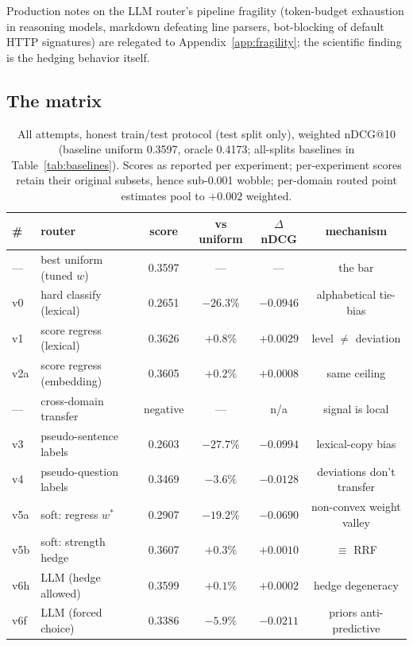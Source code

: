 \documentclass[11pt]{article}
\begin{document}
Production notes on the LLM router's pipeline fragility (token-budget exhaustion in reasoning models, markdown defeating line parsers, bot-blocking of default HTTP signatures) are relegated to Appendix~\ref{app:fragility}; the scientific finding is the hedging behavior itself.

\subsection{The matrix}\label{sec:matrix}
\begin{table}[H]
\centering\footnotesize
\begin{tabular}{llcccc}
\toprule
\# & router & score & vs uniform & $\Delta$nDCG & mechanism \\
\midrule
--- & best uniform (tuned $w$) & 0.3597 & --- & --- & the bar \\
v0 & hard classify (lexical) & 0.2651 & $-26.3\%$ & $-0.0946$ & alphabetical tie-bias \\
v1 & score regress (lexical) & 0.3626 & $+0.8\%$ & $+0.0029$ & level $\neq$ deviation \\
v2a & score regress (embedding) & 0.3605 & $+0.2\%$ & $+0.0008$ & same ceiling \\
--- & cross-domain transfer & negative & --- & n/a & signal is local \\
v3 & pseudo-sentence labels & 0.2603 & $-27.7\%$ & $-0.0994$ & lexical-copy bias \\
v4 & pseudo-question labels & 0.3469 & $-3.6\%$ & $-0.0128$ & deviations don't transfer \\
v5a & soft: regress $w^*$ & 0.2907 & $-19.2\%$ & $-0.0690$ & non-convex weight valley \\
v5b & soft: strength hedge & 0.3607 & $+0.3\%$ & $+0.0010$ & $\equiv$ RRF \\
v6h & LLM (hedge allowed) & 0.3599 & $+0.1\%$ & $+0.0002$ & hedge degeneracy \\
v6f & LLM (forced choice) & 0.3386 & $-5.9\%$ & $-0.0211$ & priors anti-predictive \\
\bottomrule
\end{tabular}
\caption{All attempts, honest train/test protocol (test split only), weighted nDCG@10 (baseline uniform 0.3597, oracle 0.4173; all-splits baselines in Table~\ref{tab:baselines}). Scores as reported per experiment; per-experiment scores retain their original subsets, hence sub-0.001 wobble; per-domain routed point estimates pool to ${+}0.002$ weighted.}
\label{tab:matrix}
\end{table}
\end{document}
